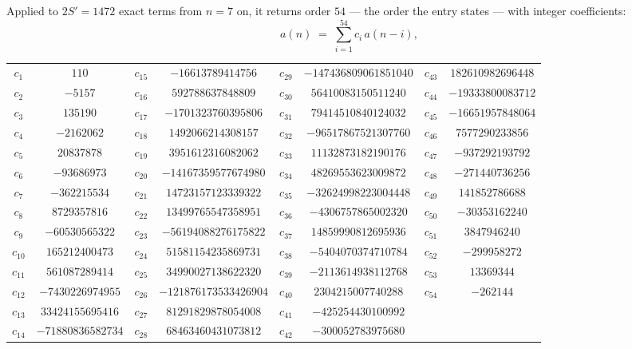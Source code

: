 \documentclass[11pt,a4paper]{article}
\theoremstyle{plain}
\theoremstyle{definition}
\begin{document}
Applied to $2S'=1472$ exact terms from $n=7$ on, it returns order $54$ --- the
order the entry states --- with integer coefficients:
\[
a(n)\;=\;\sum_{i=1}^{54}c_i\,a(n-i),
\]
\begin{center}\small
\begin{tabular}{cccccccc}
$c_{1}$ & $110$ & $c_{15}$ & $-16613789414756$ & $c_{29}$ & $-147436809061851040$ & $c_{43}$ & $182610982696448$ \\
$c_{2}$ & $-5157$ & $c_{16}$ & $592788637848809$ & $c_{30}$ & $56410083150511240$ & $c_{44}$ & $-19333800083712$ \\
$c_{3}$ & $135190$ & $c_{17}$ & $-1701323760395806$ & $c_{31}$ & $79414510840124032$ & $c_{45}$ & $-16651957848064$ \\
$c_{4}$ & $-2162062$ & $c_{18}$ & $1492066214308157$ & $c_{32}$ & $-96517867521307760$ & $c_{46}$ & $7577290233856$ \\
$c_{5}$ & $20837878$ & $c_{19}$ & $3951612316082062$ & $c_{33}$ & $11132873182190176$ & $c_{47}$ & $-937292193792$ \\
$c_{6}$ & $-93686973$ & $c_{20}$ & $-14167359577674980$ & $c_{34}$ & $48269553623009872$ & $c_{48}$ & $-271440736256$ \\
$c_{7}$ & $-362215534$ & $c_{21}$ & $14723157123339322$ & $c_{35}$ & $-32624998223004448$ & $c_{49}$ & $141852786688$ \\
$c_{8}$ & $8729357816$ & $c_{22}$ & $13499765547358951$ & $c_{36}$ & $-4306757865002320$ & $c_{50}$ & $-30353162240$ \\
$c_{9}$ & $-60530565322$ & $c_{23}$ & $-56194088276175822$ & $c_{37}$ & $14859990812695936$ & $c_{51}$ & $3847946240$ \\
$c_{10}$ & $165212400473$ & $c_{24}$ & $51581154235869731$ & $c_{38}$ & $-5404070374710784$ & $c_{52}$ & $-299958272$ \\
$c_{11}$ & $561087289414$ & $c_{25}$ & $34990027138622320$ & $c_{39}$ & $-2113614938112768$ & $c_{53}$ & $13369344$ \\
$c_{12}$ & $-7430226974955$ & $c_{26}$ & $-121876173533426904$ & $c_{40}$ & $2304215007740288$ & $c_{54}$ & $-262144$ \\
$c_{13}$ & $33424155695416$ & $c_{27}$ & $81291829878054008$ & $c_{41}$ & $-425254430100992$ &  &  \\
$c_{14}$ & $-71880836582734$ & $c_{28}$ & $68463460431073812$ & $c_{42}$ & $-300052783975680$ &  &  \\
\end{tabular}
\end{center}
\end{document}
